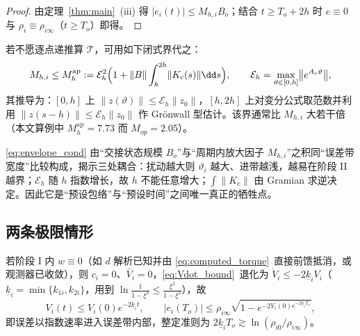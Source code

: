 \begin{proof}
由定理~\ref{thm:main}~(iii) 得 \(\lvert e_i(t)\rvert\le M_{h,i}B_o\)；结合 \(t\ge T_o+2h\) 时 \(e\equiv0\) 与 \(\rho_i\equiv\rho_{i\infty}\)（\(t\ge T_o\)）即得。
\end{proof}

\begin{remark}[闭式先验上界]\label{rem:Mh_apriori}
若不愿逐点递推算 \(\mathcal T\)，可用如下闭式界代之：
\begin{equation}
M_{h,i}\le M_h^{\mathrm{ap}}:=\mathcal E_h^{2}\Bigl(1+\lVert B\rVert\int_h^{2h}\lVert K_c(s)\rVert\dd s\Bigr),
\qquad \mathcal E_h=\max_{\vartheta\in[0,h]}\bigl\lVert e^{A_c\vartheta}\bigr\rVert ,
\label{eq:Mh_ap}
\end{equation}
其推导为：\([0,h]\) 上 \(\lVert z(\vartheta)\rVert\le\mathcal E_h\lVert z_0\rVert\)，\([h,2h]\) 上对变分公式取范数并利用 \(\lVert z(s-h)\rVert\le\mathcal E_h\lVert z_0\rVert\) 作 Grönwall 型估计。该界通常比 \(M_{h,i}\) 大若干倍（本文算例中 \(M_h^{\mathrm{ap}}=7.73\) 而 \(M_{op}=2.05\)）。
\end{remark}

\begin{remark}[判据的结构含义]\label{rem:envelope_cond}
\eqref{eq:envelope_cond} 由“交接状态规模 \(B_o\)”与“周期内放大因子 \(M_{h,i}\)”之积同“误差带宽度”比较构成，揭示三处耦合：扰动越大则 \(\vartheta_i\) 越大、进带越浅，越易在阶段 II 越界；\(\mathcal E_h\) 随 \(h\) 指数增长，故 \(h\) 不能任意增大；\(\int\lVert K_c\rVert\) 由 Gramian 求逆决定。因此它是“预设包络”与“预设时间”之间唯一真正的牺牲点。
\end{remark}

\subsection{两条极限情形}
\label{sec:limits}

\begin{corollary}[无残差情形的定量贴合率]\label{cor:exponential}
若阶段 I 内 \(w\equiv0\)（如 \(d\) 解析已知并由 \eqref{eq:computed_torque}~直接前馈抵消，或观测器已收敛），则 \(c_i=0\)、\(\bar V_i=0\)，\eqref{eq:Vdot_bound}~退化为 \(\dot V_i\le-2\underline k_iV_i\)（\(\underline k_i=\min\{k_{1i},k_{2i}\}\)，用到 \(\ln\frac{1}{1-\xi^2}\le\frac{\xi^2}{1-\xi^2}\)），故
\begin{equation}
V_i(t)\le V_i(0)e^{-2\underline k_it},\qquad
\lvert e_i(T_o)\rvert\le\rho_{i\infty}\sqrt{1-e^{-2V_i(0)e^{-2\underline k_iT_o}}} ,
\label{eq:exp_funnel}
\end{equation}
即误差以指数速率进入误差带内部，整定准则为 \(2\underline k_iT_o\gtrsim\ln(\rho_{i0}/\rho_{i\infty})\)。
\end{corollary}

